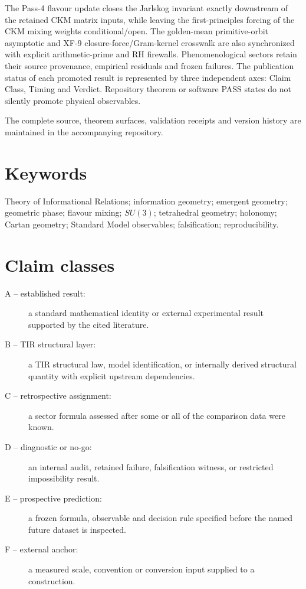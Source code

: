 The Pass-4 flavour update closes the Jarlskog invariant exactly downstream of the retained CKM matrix inputs, while leaving the first-principles forcing of the CKM mixing weights conditional/open. The golden-mean primitive-orbit asymptotic and XF-9 closure-force/Gram-kernel crosswalk are also synchronized with explicit arithmetic-prime and RH firewalls. Phenomenological sectors retain their source provenance, empirical residuals and frozen failures. The publication status of each promoted result is represented by three independent axes: Claim Class, Timing and Verdict. Repository theorem or software PASS states do not silently promote physical observables.

The complete source, theorem surfaces, validation receipts and version history are maintained in the accompanying repository.

\section*{Keywords}
Theory of Informational Relations; information geometry; emergent geometry; geometric phase; flavour mixing; $SU(3)$; tetrahedral geometry; holonomy; Cartan geometry; Standard Model observables; falsification; reproducibility.

\section*{Claim classes}
\begin{description}
  \item[A -- established result:] a standard mathematical identity or external experimental result supported by the cited literature.
  \item[B -- TIR structural layer:] a TIR structural law, model identification, or internally derived structural quantity with explicit upstream dependencies.
  \item[C -- retrospective assignment:] a sector formula assessed after some or all of the comparison data were known.
  \item[D -- diagnostic or no-go:] an internal audit, retained failure, falsification witness, or restricted impossibility result.
  \item[E -- prospective prediction:] a frozen formula, observable and decision rule specified before the named future dataset is inspected.
  \item[F -- external anchor:] a measured scale, convention or conversion input supplied to a construction.
\end{description}

